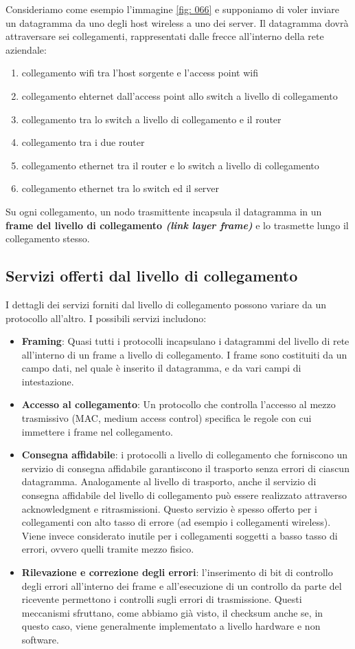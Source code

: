 \documentclass[11pt,a4paper]{book}
\begin{document}
Consideriamo come esempio l'immagine \ref{fig: 066} e supponiamo di voler inviare un datagramma da uno degli host wireless a uno dei server. Il datagramma dovrà attraversare sei collegamenti, rappresentati dalle frecce all'interno della rete aziendale:
\begin{enumerate}
	\item collegamento wifi tra l'host sorgente e l'access point wifi
	\item collegamento ehternet dall'access point allo switch a livello di collegamento
	\item collegamento tra lo switch a livello di collegamento e il router
	\item collegamento tra i due router
	\item collegamento ethernet tra il router e lo switch a livello di collegamento
	\item collegamento ethernet tra lo switch ed il server
\end{enumerate}
Su ogni collegamento, un nodo trasmittente incapsula il datagramma in un \textbf{frame del livello di collegamento \textit{(link layer frame)}} e lo trasmette lungo il collegamento stesso.
\subsection{Servizi offerti dal livello di collegamento}
I dettagli dei servizi forniti dal livello di collegamento possono variare da un protocollo all'altro. I possibili servizi includono:
\begin{itemize}
	\item \textbf{Framing}: Quasi tutti i protocolli incapsulano i datagrammi del livello di rete all'interno di un frame a livello di collegamento. I frame sono costituiti da un campo dati, nel quale è inserito il datagramma, e da vari campi di intestazione.
	\item \textbf{Accesso al collegamento}: Un protocollo che controlla l'accesso al mezzo trasmissivo (MAC, medium access control) specifica le regole con cui immettere i frame nel collegamento.
	\item \textbf{Consegna affidabile}: i protocolli a livello di collegamento che forniscono un servizio di consegna affidabile garantiscono il trasporto senza errori di ciascun datagramma. Analogamente al livello di trasporto, anche il servizio di consegna affidabile del livello di collegamento può essere realizzato attraverso acknowledgment e ritrasmissioni. Questo servizio è spesso offerto per i collegamenti con alto tasso di errore (ad esempio i collegamenti wireless). Viene invece considerato inutile per i collegamenti soggetti a basso tasso di errori, ovvero quelli tramite mezzo fisico.
	\item \textbf{Rilevazione e correzione degli errori}: l'inserimento di bit di controllo degli errori all'interno dei frame e all'esecuzione di un controllo da parte del ricevente permettono i controlli sugli errori di trasmissione. Questi meccanismi sfruttano, come abbiamo già visto, il checksum anche se, in questo caso, viene generalmente implementato a livello hardware e non software.
\end{itemize}
\end{document}
